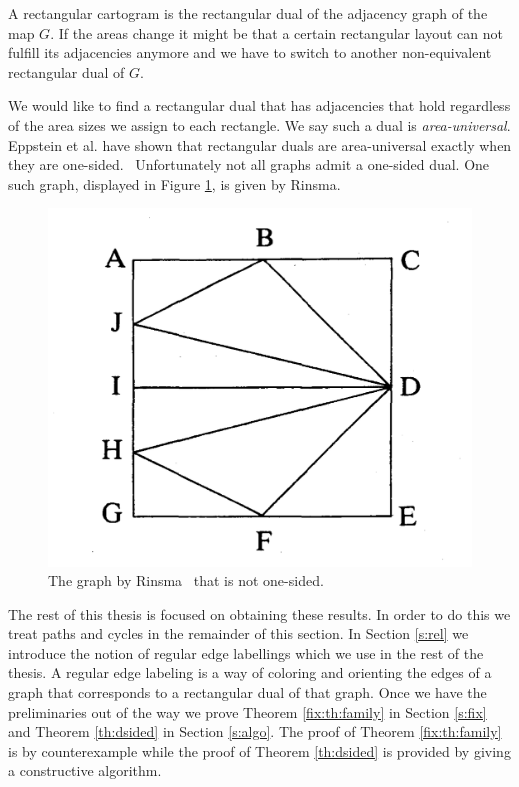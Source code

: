   A rectangular cartogram is the rectangular dual of the adjacency graph of the map $G$.
  If the areas change it might be that a certain rectangular layout can not fulfill its adjacencies anymore and we have to switch to another non-equivalent rectangular dual of $G$.

  We would like to find a rectangular dual that has adjacencies that hold regardless of the area sizes we assign to each rectangle. We say such a dual is \emph{area-universal}.
  Eppstein et al. have shown that rectangular duals are area-universal exactly when they are one-sided.~\cite{Eppstein2012} Unfortunately not all graphs admit a one-sided dual. One such graph, displayed in Figure \ref{fig:intro:rinsma},  is given by Rinsma.~\cite{Rinsma1987}

  \begin{figure}[!t]
    \centering
    \includegraphics[scale=.15]{introduction/img/rinsma.png}
    \caption{The graph by Rinsma~\cite{Rinsma1987} that is not one-sided.}
    \label{fig:intro:rinsma}
  \end{figure}

  The rest of this thesis is focused on obtaining these results.
  In order to do this we treat paths and cycles in the remainder of this section. In Section \ref{s:rel} we introduce the notion of regular edge labellings which we use in the rest of the thesis. A regular edge labeling is a way of coloring and orienting the edges of a graph that corresponds to a rectangular dual of that graph.
  Once we have the preliminaries out of the way we prove Theorem \ref{fix:th:family} in Section \ref{s:fix} and Theorem \ref{th:dsided} in Section \ref{s:algo}. The proof of Theorem \ref{fix:th:family} is by counterexample while the proof of Theorem \ref{th:dsided} is provided by giving a constructive algorithm.


